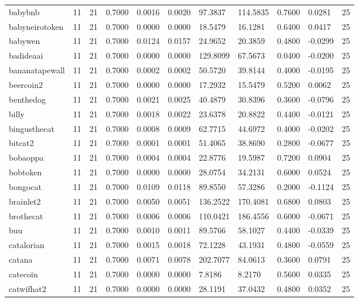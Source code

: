\begin{table}[htbp]
\begin{tabular}{lllllllllll}
babybnb & 11 & 21 & 0.7000 & 0.0016 & 0.0020 & 97.3837 & 114.5835 & 0.7600 & 0.0281 & 25 \\
babyneirotoken & 11 & 21 & 0.7000 & 0.0000 & 0.0000 & 18.5479 & 16.1281 & 0.6400 & 0.0417 & 25 \\
babywen & 11 & 21 & 0.7000 & 0.0124 & 0.0157 & 24.9652 & 20.3859 & 0.4800 & -0.0299 & 25 \\
badideaai & 11 & 21 & 0.7000 & 0.0000 & 0.0000 & 129.8099 & 67.5673 & 0.0400 & -0.0200 & 25 \\
bananatapewall & 11 & 21 & 0.7000 & 0.0002 & 0.0002 & 50.5720 & 39.8144 & 0.4000 & -0.0195 & 25 \\
beercoin2 & 11 & 21 & 0.7000 & 0.0000 & 0.0000 & 17.2932 & 15.5479 & 0.5200 & 0.0062 & 25 \\
benthedog & 11 & 21 & 0.7000 & 0.0021 & 0.0025 & 40.4879 & 30.8396 & 0.3600 & -0.0796 & 25 \\
billy & 11 & 21 & 0.7000 & 0.0018 & 0.0022 & 23.6378 & 20.8822 & 0.4400 & -0.0121 & 25 \\
bingusthecat & 11 & 21 & 0.7000 & 0.0008 & 0.0009 & 62.7715 & 44.6972 & 0.4000 & -0.0202 & 25 \\
bitcat2 & 11 & 21 & 0.7000 & 0.0001 & 0.0001 & 51.4065 & 38.8690 & 0.2800 & -0.0677 & 25 \\
bobaoppa & 11 & 21 & 0.7000 & 0.0004 & 0.0004 & 22.8776 & 19.5987 & 0.7200 & 0.0904 & 25 \\
bobtoken & 11 & 21 & 0.7000 & 0.0000 & 0.0000 & 28.0754 & 34.2131 & 0.6000 & 0.0524 & 25 \\
bongocat & 11 & 21 & 0.7000 & 0.0109 & 0.0118 & 89.8550 & 57.3286 & 0.2000 & -0.1124 & 25 \\
brainlet2 & 11 & 21 & 0.7000 & 0.0050 & 0.0051 & 136.2522 & 170.4081 & 0.6800 & 0.0803 & 25 \\
brothecat & 11 & 21 & 0.7000 & 0.0006 & 0.0006 & 110.0421 & 186.4556 & 0.6000 & -0.0671 & 25 \\
buu & 11 & 21 & 0.7000 & 0.0010 & 0.0011 & 89.5766 & 58.1027 & 0.4400 & -0.0339 & 25 \\
catalorian & 11 & 21 & 0.7000 & 0.0015 & 0.0018 & 72.1228 & 43.1931 & 0.4800 & -0.0559 & 25 \\
catana & 11 & 21 & 0.7000 & 0.0071 & 0.0078 & 202.7077 & 84.0613 & 0.3600 & 0.0791 & 25 \\
catecoin & 11 & 21 & 0.7000 & 0.0000 & 0.0000 & 7.8186 & 8.2170 & 0.5600 & 0.0335 & 25 \\
catwifhat2 & 11 & 21 & 0.7000 & 0.0000 & 0.0000 & 28.1191 & 37.0432 & 0.4800 & 0.0352 & 25 \\

\end{tabular}
\end{table}
